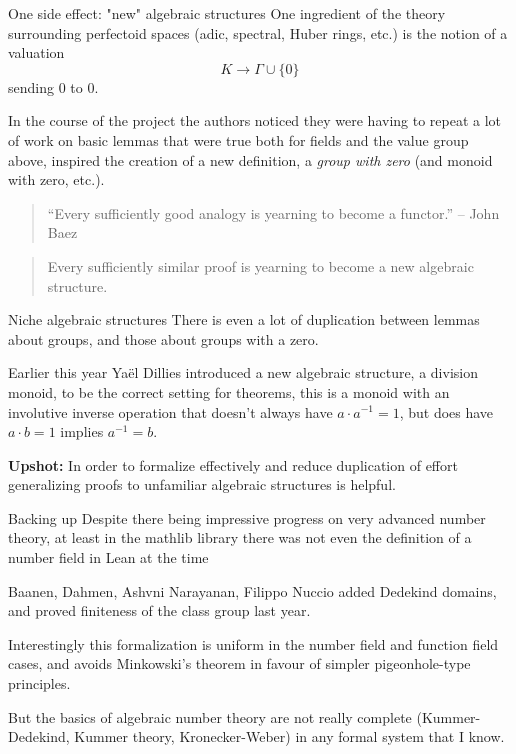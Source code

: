 \documentclass{beamer}
\theoremstyle{plain}
\newcommand{\inv}{^{-1}}
\begin{document}
\begin{frame}{One side effect: "new" algebraic structures}
    One ingredient of the theory surrounding perfectoid spaces (adic, spectral, Huber rings, etc.) is the notion of a valuation
    $$K \to \Gamma \cup \{0\}$$
    sending 0 to 0.

    In the course of the project the authors noticed they were having to repeat a lot of work on basic lemmas that were true both for fields and the value group above, inspired the creation of a new definition, a \emph{group with zero} (and monoid with zero, etc.).

    \begin{quote}
    ``Every sufficiently good analogy is yearning to become a functor.'' -- John Baez
    \end{quote}

    \begin{quote}
    Every sufficiently similar proof is yearning to become a new algebraic structure.
    \end{quote}
\end{frame}

\begin{frame}{Niche algebraic structures}
    There is even a lot of duplication between lemmas about groups, and those about groups with a zero.

    Earlier this year Yaël Dillies introduced a new algebraic structure, a division monoid, to be the correct setting for theorems, this is a monoid with an involutive inverse operation that doesn't always have $a \cdot a\inv  = 1$, but does have $a \cdot b = 1$ implies $a \inv = b$.

    \textbf{Upshot:} In order to formalize effectively and reduce duplication of effort generalizing proofs to unfamiliar algebraic structures is helpful.

\end{frame}


\begin{frame}{Backing up}
    Despite there being impressive progress on very advanced number theory, at least in the mathlib library there was not even the definition of a number field in Lean at the time

    Baanen, Dahmen, Ashvni Narayanan, Filippo Nuccio added Dedekind domains, and proved finiteness of the class group last year.

    Interestingly this formalization is uniform in the number field and function field cases, and avoids Minkowski's theorem in favour of simpler pigeonhole-type principles.

    But the basics of algebraic number theory are not really complete (Kummer-Dedekind, Kummer theory, Kronecker-Weber) in any formal system that I know.
\end{frame}
\end{document}

